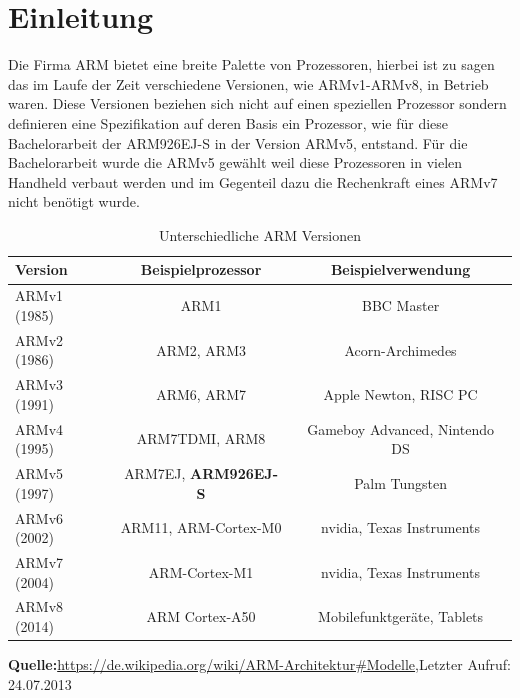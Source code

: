 \section{Einleitung}
Die Firma ARM bietet eine breite Palette von Prozessoren, hierbei ist zu sagen das im Laufe der Zeit verschiedene Versionen, wie ARMv1-ARMv8, in Betrieb waren. Diese Versionen beziehen sich nicht auf einen speziellen Prozessor sondern definieren eine Spezifikation auf deren Basis ein Prozessor, wie f\"ur diese Bachelorarbeit der ARM926EJ-S in der Version ARMv5, entstand. F\"ur die Bachelorarbeit wurde die ARMv5 gew\"ahlt weil diese Prozessoren in vielen Handheld verbaut werden und im Gegenteil dazu die Rechenkraft eines ARMv7 nicht ben\"otigt wurde.
\begin{table}[h!]
\centering
\begin{tabular}{|l|c|c|}
\hline
Version & Beispielprozessor & Beispielverwendung \\ \hline
ARMv1 (1985) & ARM1 & BBC Master \\ \hline
ARMv2 (1986) & ARM2, ARM3 & Acorn-Archimedes \\ \hline
ARMv3 (1991) & ARM6, ARM7 & Apple Newton, RISC PC \\ \hline
ARMv4 (1995) & ARM7TDMI, ARM8 & Gameboy Advanced, Nintendo DS \\ \hline
ARMv5 (1997) & ARM7EJ, \textbf{ARM926EJ-S} & Palm Tungsten \\ \hline
ARMv6 (2002) & ARM11, ARM-Cortex-M0 & nvidia, Texas Instruments \\ \hline
ARMv7 (2004) & ARM-Cortex-M1 & nvidia, Texas Instruments  \\ \hline
ARMv8 (2014) & ARM Cortex-A50 & Mobilefunktger\"ate, Tablets \\ \hline
\end{tabular}\vspace{0.5cm}
\footnotesize\textbf{Quelle:}\url{https://de.wikipedia.org/wiki/ARM-Architektur#Modelle},Letzter Aufruf: 24.07.2013
\caption{Unterschiedliche ARM Versionen}
\end{table}
\newpage
